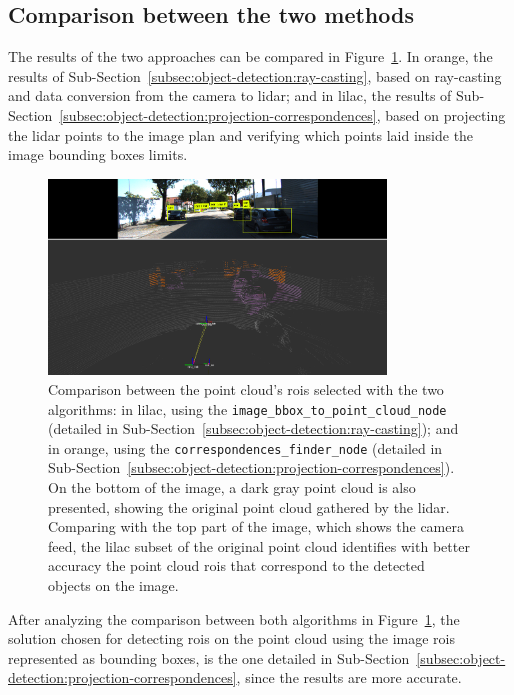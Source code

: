 \subsection{Comparison between the two methods}
The results of the two approaches can be compared in Figure~\ref{fig:rois-matching-comparison}. In orange, the results of Sub-Section~\ref{subsec:object-detection:ray-casting}, based on ray-casting and data conversion from the camera to \ac{lidar}; and in lilac, the results of Sub-Section~\ref{subsec:object-detection:projection-correspondences}, based on projecting the \ac{lidar} points to the image plan and verifying which points laid inside the image bounding boxes limits.


\begin{figure}[!ht]
	\centering
	\includegraphics[width=0.8\textwidth]{img/image-object-to-point-cloud/rois-comparison.png}
	\caption[Comparison between the $3D \rightarrow 2D$ and frustum filtering correspondences algorithm results.]{Comparison between the point cloud's \acp{roi} selected with the two algorithms: in lilac, using the \texttt{image\_bbox\_to\_point\_cloud\_node} (detailed in Sub-Section~\ref{subsec:object-detection:ray-casting}); and in orange, using the \texttt{correspondences\_finder\_node} (detailed in Sub-Section~\ref{subsec:object-detection:projection-correspondences}). On the bottom of the image, a dark gray point cloud is also presented, showing the original point cloud gathered by the \ac{lidar}. Comparing with the top part of the image, which shows the camera feed, the lilac subset of the original point cloud identifies with better accuracy the point cloud \acp{roi} that correspond to the detected objects on the image.}
	\label{fig:rois-matching-comparison}
\end{figure}

After analyzing the comparison between both algorithms in Figure~\ref{fig:rois-matching-comparison}, the solution chosen for detecting \acp{roi} on the point cloud using the image \acp{roi} represented as bounding boxes, is the one detailed in Sub-Section~\ref{subsec:object-detection:projection-correspondences}, since the results are more accurate.


